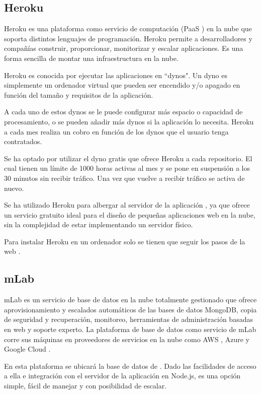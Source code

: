 \subsection{ Heroku }

Heroku es una plataforma como servicio de computación (PaaS \cite{URL::PaaS}) en la nube que soporta distintos lenguajes de programación. Heroku permite a desarrolladores y compañías construir, proporcionar, monitorizar y escalar aplicaciones. Es una forma sencilla de montar una infraestructura en la nube.

Heroku es conocida por ejecutar las aplicaciones en ``dynos". Un dyno es simplemente un ordenador virtual que pueden ser encendido y/o apagado en función del tamaño y requisitos de la aplicación.

A cada uno de estos dynos se le puede configurar más espacio o capacidad de procesamiento, o se pueden añadir más dynos si la aplicación lo necesita. Heroku a cada mes realiza un cobro en función de los dynos que el usuario tenga contratados. 

Se ha optado por utilizar el dyno gratis que ofrece Heroku a cada repositorio. El cual tienen un límite de 1000 horas activas al mes y se pone en suspensión a los 30 minutos sin recibir tráfico. Una vez que vuelve a recibir tráfico se activa de nuevo.   

Se ha utilizado Heroku para albergar al servidor de la aplicación \ULLAR{}, ya que ofrece un servicio gratuito ideal para el diseño de pequeñas aplicaciones web en la nube, sin la complejidad de estar implementando un servidor físico. 

Para instalar Heroku en un ordenador solo se tienen que seguir los pasos de la web \cite{URL::HerokuCLI}.



\subsection{ mLab }

mLab es un servicio de base de datos en la nube totalmente gestionado que ofrece aprovisionamiento y escalados automáticos de las bases de datos MongoDB, copia de seguridad y recuperación, monitoreo, herramientas de administración basadas en web y soporte experto. La plataforma de base de datos como servicio de mLab corre sus máquinas en proveedores de servicios en la nube como AWS \cite{URL::aws}, Azure \cite{URL::Azure} y Google Cloud \cite{URL::GoogleCloud}.

En esta plataforma se ubicará la base de datos de \ULLAR{}. Dado las facilidades de acceso a ella e integración con el servidor de la aplicación en Node.js, es una opción simple, fácil de manejar y con posibilidad de escalar.

